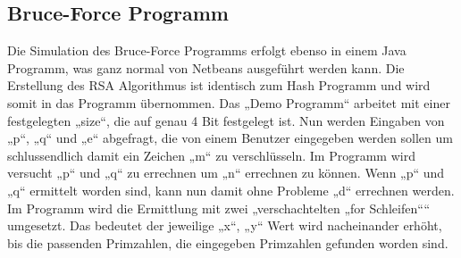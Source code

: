 \subsection{Bruce-Force Programm}
Die Simulation des Bruce-Force Programms erfolgt ebenso in einem Java Programm, was ganz normal von Netbeans ausgeführt werden kann. Die Erstellung des RSA Algorithmus ist identisch zum Hash Programm und wird somit in das Programm übernommen. Das „Demo Programm“ arbeitet mit einer festgelegten „size“, die auf genau 4 Bit festgelegt ist. Nun werden Eingaben von „p“, „q“ und „e“ abgefragt, die von einem Benutzer eingegeben werden sollen um schlussendlich damit ein Zeichen „m“ zu verschlüsseln. Im Programm wird versucht „p“ und „q“ zu errechnen um „n“ errechnen zu können. Wenn „p“ und „q“ ermittelt worden sind, kann nun damit ohne Probleme „d“ errechnen werden. Im Programm wird die Ermittlung mit zwei „verschachtelten „for Schleifen““ umgesetzt. Das bedeutet der jeweilige „x“, „y“ Wert wird nacheinander erhöht, bis die passenden Primzahlen, die eingegeben Primzahlen gefunden worden sind.

